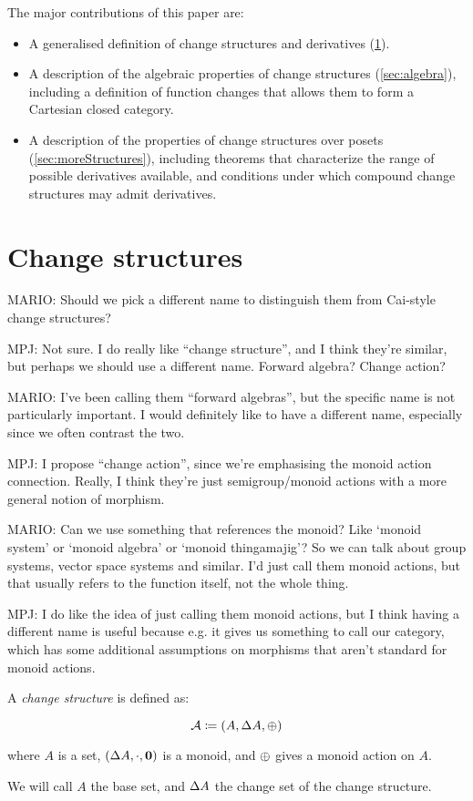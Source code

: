 The major contributions of this paper are:
\begin{itemize}
  \item A generalised definition of change structures and derivatives
    (\ref{sec:change-structures}).
  \item A description of the algebraic properties of change structures (\ref{sec:algebra}), including
    a definition of function changes that allows them to form a Cartesian closed
    category.
  \item A description of the properties of change structures over posets
    (\ref{sec:moreStructures}), including theorems that characterize the range of
    possible derivatives available, and conditions under which compound change
    structures may admit derivatives.
\end{itemize}

\section{Change structures}
\label{sec:change-structures}

MARIO: Should we pick a different name to distinguish them from Cai-style change structures?

MPJ: Not sure. I do really like ``change structure'', and I think they're
similar, but perhaps we should use a different name. Forward algebra? Change action?

MARIO: I've been calling them ``forward algebras'', but the specific name is not particularly
important. I would definitely like to have a different name, especially since we often contrast the two.

MPJ: I propose ``change action'', since we're emphasising the monoid action
connection. Really, I think they're just semigroup/monoid actions with a more
general notion of morphism.

MARIO: Can we use something that references the monoid? Like `monoid system' or
`monoid algebra' or `monoid thingamajig'? So we can talk about group systems, vector
space systems and similar.
I'd just call them monoid actions, but that usually refers to the function itself, not
the whole thing.

MPJ: I do like the idea of just calling them monoid actions, but I think having
a different name is useful because e.g. it gives us something to call our
category, which has some additional assumptions on morphisms that aren't
standard for monoid actions.

\begin{defn}
  A \textit{change structure} is defined as:

  $$\mathcal{A} \coloneqq (A,\Delta A,\oplus)$$

  where $A$ is a set, $(\Delta A, \cdot, \textbf{0})$ is a monoid, and $\oplus$ gives a monoid action on $A$.

  We will call $A$ the base set, and $\Delta A$ the change set of the change structure.
\end{defn}

